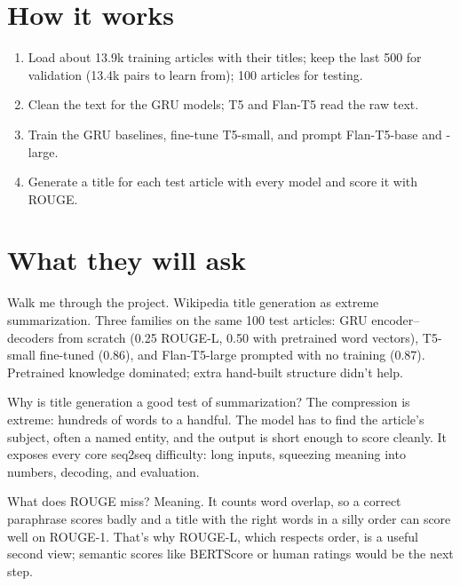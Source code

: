\section{How it works}
\begin{enumerate}
  \item Load about 13.9k training articles with their titles; keep the last 500 for validation (13.4k pairs to learn from); 100 articles for testing.
  \item Clean the text for the GRU models; T5 and Flan-T5 read the raw text.
  \item Train the GRU baselines, fine-tune T5-small, and prompt Flan-T5-base and -large.
  \item Generate a title for each test article with every model and score it with ROUGE.
\end{enumerate}

\section{What they will ask}

\begin{iq}[\core]{Walk me through the project.}
Wikipedia title generation as extreme summarization. Three families on the same 100 test articles: GRU encoder--decoders from scratch (0.25 ROUGE-L, 0.50 with pretrained word vectors), T5-small fine-tuned (0.86), and Flan-T5-large prompted with no training (0.87). Pretrained knowledge dominated; extra hand-built structure didn't help.
\end{iq}

\begin{iq}[\core]{Why is title generation a good test of summarization?}
The compression is extreme: hundreds of words to a handful. The model has to find the article's subject, often a named entity, and the output is short enough to score cleanly. It exposes every core seq2seq difficulty: long inputs, squeezing meaning into numbers, decoding, and evaluation.
\end{iq}

\begin{iq}[\core]{What does ROUGE miss?}
Meaning. It counts word overlap, so a correct paraphrase scores badly and a title with the right words in a silly order can score well on ROUGE-1. That's why ROUGE-L, which respects order, is a useful second view; semantic scores like BERTScore or human ratings would be the next step.
\end{iq}

